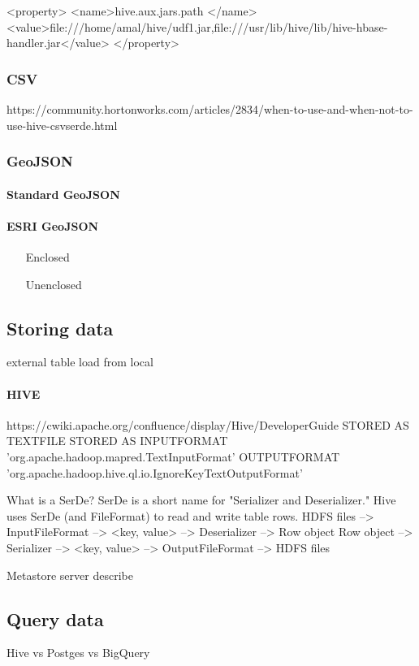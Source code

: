 \documentclass[a4paper,12pt,oneside]{report}
\begin{document}
<property>
  <name>hive.aux.jars.path </name>
  <value>file:///home/amal/hive/udf1.jar,file:///usr/lib/hive/lib/hive-hbase-handler.jar</value>
</property>
	
		\subsubsection{CSV}
		
		https://community.hortonworks.com/articles/2834/when-to-use-and-when-not-to-use-hive-csvserde.html
		\subsubsection{GeoJSON}\label{json}	
			\paragraph{Standard GeoJSON}	
			\paragraph{ESRI GeoJSON}
				\begin{enumerate}
					\item[Enclosed]
					\item[Unenclosed]
				\end{enumerate}
	
	
	\subsection{Storing data}
	external table
	load from local


	\paragraph{HIVE}
	https://cwiki.apache.org/confluence/display/Hive/DeveloperGuide
	STORED AS TEXTFILE	
STORED AS INPUTFORMAT
  'org.apache.hadoop.mapred.TextInputFormat'
  OUTPUTFORMAT
  'org.apache.hadoop.hive.ql.io.IgnoreKeyTextOutputFormat'
	
	
	What is a SerDe?
SerDe is a short name for "Serializer and Deserializer."
Hive uses SerDe (and FileFormat) to read and write table rows.
HDFS files --> InputFileFormat --> <key, value> --> Deserializer --> Row object
Row object --> Serializer --> <key, value> --> OutputFileFormat --> HDFS files

	
	Metastore server describe
	
	
	
	\subsection{Query data}
	Hive vs Postges vs BigQuery
	
\end{document}
